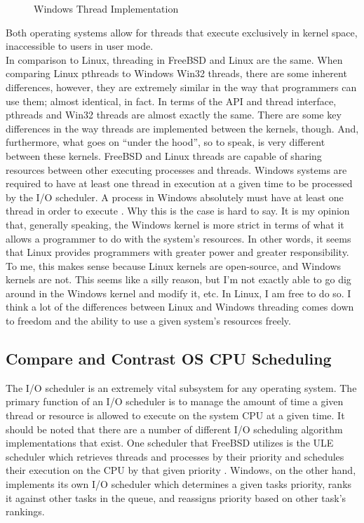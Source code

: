 \documentclass[onecolumn, draftclsnofoot,10pt, compsoc]{IEEEtran}
\begin{document}
\begin{figure}[H]
    \centering
    
    \caption{Windows Thread Implementation}
    \label{fig:win1}
\end{figure}

\noindent Both operating systems allow for threads that execute exclusively in kernel space, inaccessible to users in user mode.\\

\noindent In comparison to Linux, threading in FreeBSD and Linux are the same. When comparing Linux pthreads to Windows Win32 threads, there are some inherent differences, however, they are extremely similar in the way that programmers can use them; almost identical, in fact. In terms of the API and thread interface, pthreads and Win32 threads are almost exactly the same. There are some key differences in the way threads are implemented between the kernels, though. And, furthermore, what goes on “under the hood”, so to speak, is very different between these kernels. FreeBSD and Linux threads are capable of sharing resources between other executing processes and threads. Windows systems are required to have at least one thread in execution at a given time to be processed by the I/O scheduler. A process in Windows absolutely must have at least one thread in order to execute \cite{MSWindows1PTCS}. Why this is the case is hard to say. It is my opinion that, generally speaking, the Windows kernel is more strict in terms of what it allows a programmer to do with the system’s resources. In other words, it seems that Linux provides programmers with greater power and greater responsibility. To me, this makes sense because Linux kernels are open-source, and Windows kernels are not. This seems like a silly reason, but I’m not exactly able to go dig around in the Windows kernel and modify it, etc. In Linux, I am free to do so. I think a lot of the differences between Linux and Windows threading comes down to freedom and the ability to use a given system’s resources freely.\\

\subsection{Compare and Contrast OS CPU Scheduling}
\noindent The I/O scheduler is an extremely vital subsystem for any operating system. The primary function of an I/O scheduler is to manage the amount of time a given thread or resource is allowed to execute on the system CPU at a given time. It should be noted that there are a number of different I/O scheduling algorithm implementations that exist. One scheduler that FreeBSD utilizes is the ULE scheduler which retrieves threads and processes by their priority and schedules their execution on the CPU by that given priority \cite{FreeBSD1PTCS}. Windows, on the other hand, implements its own I/O scheduler which determines a given tasks priority, ranks it against other tasks in the queue, and reassigns priority based on other task’s rankings.\\
\end{document}

